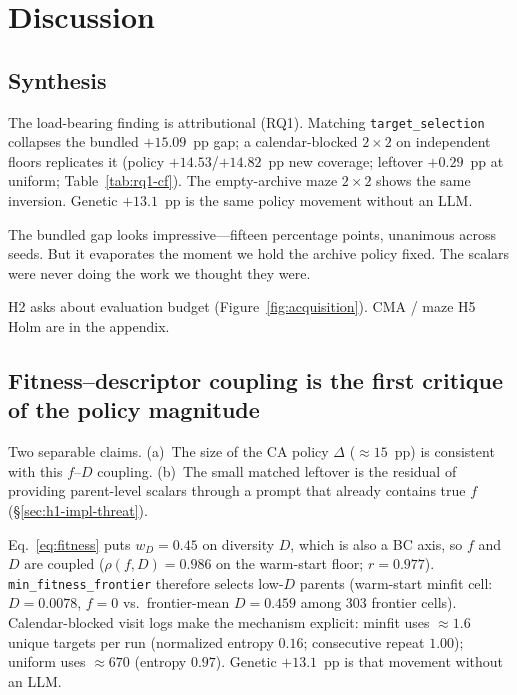 \documentclass[preprint,12pt]{elsarticle}
\begin{document}
\section{Discussion}
\label{sec:discussion}

\subsection{Synthesis}

The load-bearing finding is attributional (RQ1). Matching \texttt{target\_selection} collapses the bundled $+15.09$~pp gap; a calendar-blocked $2\times2$ on independent floors replicates it (policy $+14.53$/$+14.82$~pp new coverage; leftover $+0.29$~pp at uniform; Table~\ref{tab:rq1-cf}). The empty-archive maze $2\times2$ shows the same inversion. Genetic $+13.1$~pp is the same policy movement without an LLM.

The bundled gap looks impressive---fifteen percentage points, unanimous across seeds. But it evaporates the moment we hold the archive policy fixed. The scalars were never doing the work we thought they were.

H2 asks about evaluation budget (Figure~\ref{fig:acquisition}). CMA / maze H5 Holm are in the appendix.

\subsection{Fitness--descriptor coupling is the first critique of the policy magnitude}
\label{sec:fd-coupling}

Two separable claims. (a)~The size of the CA policy $\Delta$ (${\approx}15$~pp) is consistent with this $f$--$D$ coupling. (b)~The small matched leftover is the residual of providing parent-level scalars through a prompt that already contains true $f$ (\S\ref{sec:h1-impl-threat}).

Eq.~\eqref{eq:fitness} puts $w_D{=}0.45$ on diversity $D$, which is also a BC axis, so $f$ and $D$ are coupled ($\rho(f,D){=}0.986$ on the warm-start floor; $r{=}0.977$). \texttt{min\_fitness\_frontier} therefore selects low-$D$ parents (warm-start minfit cell: $D{=}0.0078$, $f{=}0$ vs.\ frontier-mean $D{=}0.459$ among $303$ frontier cells). Calendar-blocked visit logs make the mechanism explicit: minfit uses ${\approx}1.6$ unique targets per run (normalized entropy $0.16$; consecutive repeat $1.00$); uniform uses ${\approx}670$ (entropy $0.97$). Genetic $+13.1$~pp is that movement without an LLM.
\end{document}
